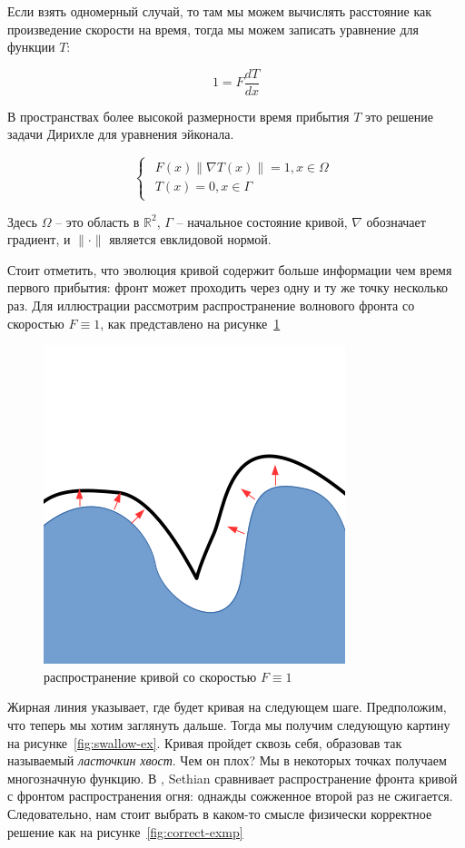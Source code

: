 \documentclass[a4paper,12pt]{article}
\begin{document}
Если взять одномерный случай, то там мы можем вычислять расстояние как
произведение скорости на время, тогда мы можем записать уравнение для
функции $T$:

\begin{equation*}
  1 = F \frac{dT}{dx}
\end{equation*}

В пространствах более высокой размерности время прибытия $T$ это решение
задачи Дирихле для уравнения эйконала.

\begin{equation}
  \label{eq:eikonal}
  \begin{cases}
    \begin{array}{ll}
      F(x) \| \nabla T(x) \| = 1, x \in \Omega \\
      T(x) = 0, x \in \Gamma
    \end{array}
  \end{cases}
\end{equation}

Здесь $\Omega$ -- это область в $\mathbb{R}^2$, $\Gamma$ -- начальное
состояние кривой, $\nabla$ обозначает градиент, и $\| \cdot \|$ является
евклидовой нормой.

Стоит отметить, что эволюция кривой содержит больше информации чем
время первого прибытия: фронт может проходить через одну и ту же точку
несколько раз. Для иллюстрации рассмотрим распространение
волнового фронта со скоростью $F \equiv 1$, как представлено на
рисунке~\ref{fig:prpgt-eik}

\begin{figure}[h]
  \centering
  \includegraphics[width=0.3\linewidth]{img/propagate_eikonal.png}
  \hfil \caption{распространение кривой со скоростью $F \equiv 1$}
  \label{fig:prpgt-eik}

\end{figure}

Жирная линия указывает, где будет кривая на следующем шаге.
Предположим, что теперь мы хотим заглянуть дальше. Тогда мы получим
следующую картину на рисунке~\ref{fig:swallow-ex}. Кривая пройдет
сквозь себя, образовав так называемый \textit{ласточкин хвост}. Чем он
плох? Мы в некоторых точках получаем многозначную функцию. В
\cite{S1999}, Sethian сравнивает распространение фронта кривой с
фронтом распространения огня: однажды сожженное второй раз не
сжигается. Следовательно, нам стоит выбрать в каком-то смысле
физически корректное решение как на рисунке~\ref{fig:correct-exmp}
\end{document}
